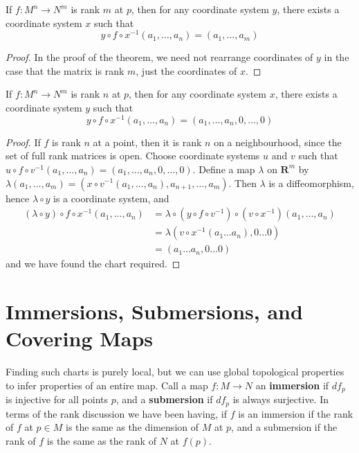 \begin{corollary}
    If $f: M^n \to N^m$ is rank $m$ at $p$, then for any coordinate system $y$, there exists a coordinate system $x$ such that
    \[ y \circ f \circ x^{-1} (a_1, \dots, a_n) = (a_1, \dots, a_m) \]
\end{corollary}
\begin{proof}
    In the proof of the theorem, we need not rearrange coordinates of $y$ in the case that the matrix is rank $m$, just the coordinates of $x$.
\end{proof}

\begin{corollary}
    If $f: M^n \to N^m$ is rank $n$ at $p$, then for any coordinate system $x$, there exists a coordinate system $y$ such that
    \[ y \circ f \circ x^{-1} (a_1, \dots, a_n) = (a_1, \dots, a_n, 0, \dots, 0) \]
\end{corollary}
\begin{proof}
    If $f$ is rank $n$ at a point, then it is rank $n$ on a neighbourhood, since the set of full rank matrices is open. Choose coordinate systems $u$ and $v$ such that $u \circ f \circ v^{-1}(a_1, \dots, a_n) = (a_1, \dots, a_n, 0, \dots, 0)$. Define a map $\lambda$ on $\mathbf{R}^m$ by $\lambda(a_1, \dots, a_m) = (x \circ v^{-1}(a_1, \dots, a_n), a_{n+1}, \dots, a_m)$. Then $\lambda$ is a diffeomorphism, hence $\lambda \circ y$ is a coordinate system, and
    \begin{align*}
        (\lambda \circ y) \circ f \circ x^{-1} (a_1, \dots, a_n) &= \lambda \circ (y \circ f \circ v^{-1}) \circ (v \circ x^{-1}) (a_1, \dots, a_n)\\
        &= \lambda (v \circ x^{-1} (a_1 \dots a_n), 0 \dots 0)\\
        &= (a_1 \dots a_n, 0 \dots 0)
    \end{align*}
    and we have found the chart required.
\end{proof}

\section{Immersions, Submersions, and Covering Maps}

Finding such charts is purely local, but we can use global topological properties to infer properties of an entire map. Call a map $f:M \to N$ an {\bf immersion} if $df_p$ is injective for all points $p$, and a {\bf submersion} if $df_p$ is always surjective. In terms of the rank discussion we have been having, if $f$ is an immersion if the rank of $f$ at $p \in M$ is the same as the dimension of $M$ at $p$, and a submersion if the rank of $f$ is the same as the rank of $N$ at $f(p)$.


